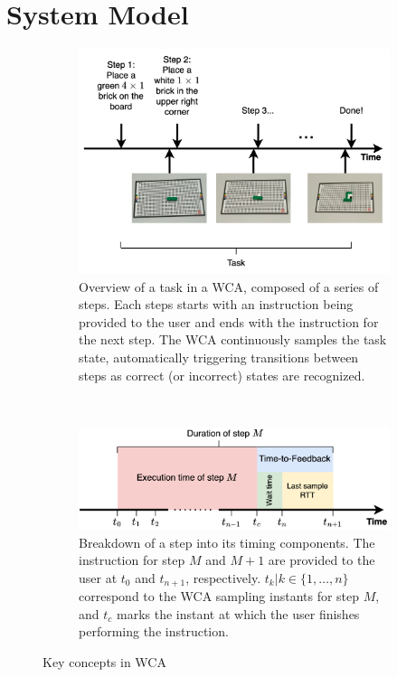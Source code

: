 \section{System Model}

\begin{figure}
    \centering
    \begin{subfigure}{\columnwidth}
        \centering
        \includegraphics[width=.9\textwidth]{figs/task}
        \caption{%
            Overview of a task in a \gls{WCA}, composed of a series of steps.
            Each steps starts with an instruction being provided to the user and ends with the instruction for the next step.
            The \gls{WCA} continuously samples the task state, automatically triggering transitions between steps as correct (or incorrect) states are recognized.
        }\label{fig:task}
    \end{subfigure}\\
    \begin{subfigure}{\columnwidth}
        \centering
        \includegraphics[width=.9\textwidth]{figs/step_time}
        \caption{%
            Breakdown of a step into its timing components.
            The instruction for step \( M \) and \( M + 1 \) are provided to the user at \( t_0 \) and \( t_{n+1} \), respectively.
            \( t_k | k \in \{1, \ldots, n \} \) correspond to the \gls{WCA} sampling instants for step \( M \), and \( t_c \) marks the instant at which the user finishes performing the instruction.
        }\label{fig:step}
    \end{subfigure}
    \caption{Key concepts in \gls{WCA}}
\end{figure}

